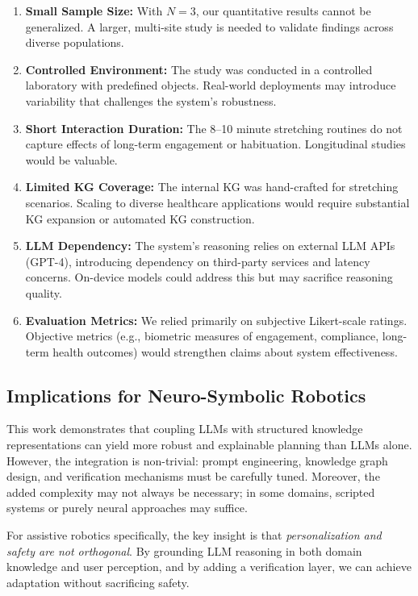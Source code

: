 \begin{enumerate}
\item \textbf{Small Sample Size:} With $N=3$, our quantitative results cannot be generalized. A larger, multi-site study is needed to validate findings across diverse populations.

\item \textbf{Controlled Environment:} The study was conducted in a controlled laboratory with predefined objects. Real-world deployments may introduce variability that challenges the system's robustness.

\item \textbf{Short Interaction Duration:} The 8–10 minute stretching routines do not capture effects of long-term engagement or habituation. Longitudinal studies would be valuable.

\item \textbf{Limited KG Coverage:} The internal KG was hand-crafted for stretching scenarios. Scaling to diverse healthcare applications would require substantial KG expansion or automated KG construction.

\item \textbf{LLM Dependency:} The system's reasoning relies on external LLM APIs (GPT-4), introducing dependency on third-party services and latency concerns. On-device models could address this but may sacrifice reasoning quality.

\item \textbf{Evaluation Metrics:} We relied primarily on subjective Likert-scale ratings. Objective metrics (e.g., biometric measures of engagement, compliance, long-term health outcomes) would strengthen claims about system effectiveness.
\end{enumerate}

\subsection{Implications for Neuro-Symbolic Robotics}

This work demonstrates that coupling LLMs with structured knowledge representations can yield more robust and explainable planning than LLMs alone. However, the integration is non-trivial: prompt engineering, knowledge graph design, and verification mechanisms must be carefully tuned. Moreover, the added complexity may not always be necessary; in some domains, scripted systems or purely neural approaches may suffice.

For assistive robotics specifically, the key insight is that \textit{personalization and safety are not orthogonal}. By grounding LLM reasoning in both domain knowledge and user perception, and by adding a verification layer, we can achieve adaptation without sacrificing safety.

